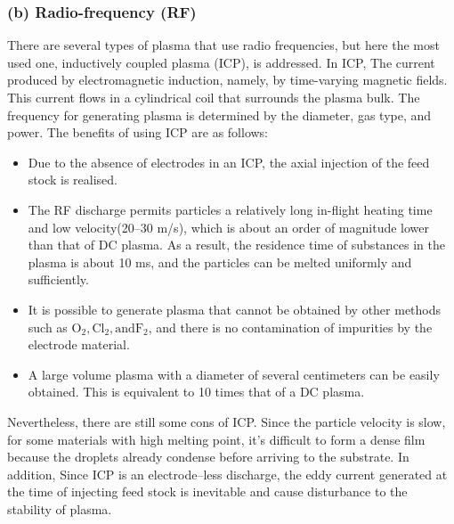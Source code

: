 \subsubsection{(b) Radio-frequency (RF)}
There are several types of plasma that use radio frequencies, but here the most used one, inductively coupled plasma (ICP), is addressed. In ICP, The current produced by electromagnetic induction, namely, by time-varying magnetic fields. This current flows in a cylindrical coil that surrounds the plasma bulk. The frequency for generating plasma is determined by the diameter, gas type, and power. The benefits of using ICP are as follows:
\begin{itemize}
  \item Due to the absence of electrodes in an ICP, the axial injection of the feed stock is realised.
  \item The RF discharge permits particles a relatively long in-flight heating time and low velocity(20--30 m/s), which is about an order of magnitude lower than that of DC plasma. As a result, the residence time of substances in the plasma is about 10 ms, and the particles can be melted uniformly and sufficiently.
  \item It is possible to generate plasma that cannot be obtained by other methods such as $\mathrm{O_{2},Cl_{2}, and  F_{2}}$, and there is no contamination of impurities by the electrode material.
  \item A large volume plasma with a diameter of several centimeters can be easily obtained. This is equivalent to 10 times that of a DC plasma.
\end{itemize}
Nevertheless, there are still some cons of ICP. Since the particle velocity is slow, for some materials with high melting point, it's difficult to form a dense film because the droplets already condense before arriving to the substrate. In addition, Since ICP is an electrode--less discharge, the eddy current generated at the time of injecting feed stock is inevitable and cause disturbance to the stability of plasma.

